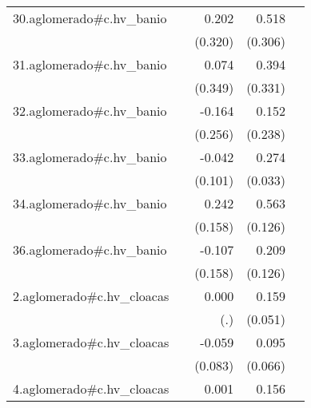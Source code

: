 {\begin{longtable}{l*{4}{D{.}{.}{-1}}}
\addlinespace
30.aglomerado#c.hv\_banio&                     &       0.202         &       0.518         &                     \\
            &                     &     (0.320)         &     (0.306)         &                     \\
\addlinespace
31.aglomerado#c.hv\_banio&                     &       0.074         &       0.394         &                     \\
            &                     &     (0.349)         &     (0.331)         &                     \\
\addlinespace
32.aglomerado#c.hv\_banio&                     &      -0.164         &       0.152         &                     \\
            &                     &     (0.256)         &     (0.238)         &                     \\
\addlinespace
33.aglomerado#c.hv\_banio&                     &      -0.042         &       0.274\sym{***}&                     \\
            &                     &     (0.101)         &     (0.033)         &                     \\
\addlinespace
34.aglomerado#c.hv\_banio&                     &       0.242         &       0.563\sym{***}&                     \\
            &                     &     (0.158)         &     (0.126)         &                     \\
\addlinespace
36.aglomerado#c.hv\_banio&                     &      -0.107         &       0.209         &                     \\
            &                     &     (0.158)         &     (0.126)         &                     \\
\addlinespace
2.aglomerado#c.hv\_cloacas&                     &       0.000         &       0.159\sym{**} &                     \\
            &                     &         (.)         &     (0.051)         &                     \\
\addlinespace
3.aglomerado#c.hv\_cloacas&                     &      -0.059         &       0.095         &                     \\
            &                     &     (0.083)         &     (0.066)         &                     \\
\addlinespace
4.aglomerado#c.hv\_cloacas&                     &       0.001         &       0.156\sym{***}&                     \\

\end{longtable}}
